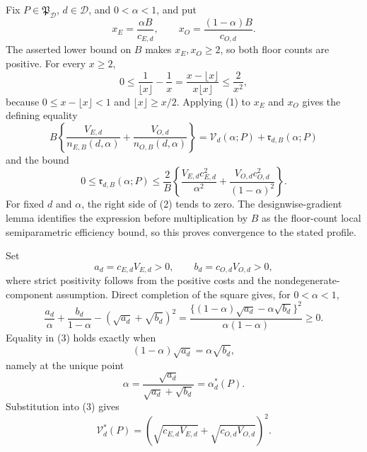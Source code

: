Fix \(P\in\mathfrak P_{\mathcal D}\), \(d\in\mathcal D\), and \(0<\alpha<1\), and put
\[
 x_E=\frac{\alpha B}{c_{E,d}},\qquad
 x_O=\frac{(1-\alpha)B}{c_{O,d}}.
\]
The asserted lower bound on \(B\) makes \(x_E,x_O\ge2\), so both floor counts are positive.  For every \(x\ge2\),
\[
 0\le \frac1{\lfloor x\rfloor}-\frac1x
 =\frac{x-\lfloor x\rfloor}{x\lfloor x\rfloor}
 \le \frac{2}{x^2}, \tag{1}
\]
because \(0\le x-\lfloor x\rfloor<1\) and \(\lfloor x\rfloor\ge x/2\).  Applying (1) to \(x_E\) and \(x_O\) gives the defining equality
\[
 B\left\{\frac{V_{E,d}}{n_{E,B}(d,\alpha)}
 +\frac{V_{O,d}}{n_{O,B}(d,\alpha)}\right\}
 =\mathcal V_d(\alpha;P)+\mathfrak r_{d,B}(\alpha;P)
\]
and the bound
\[
 0\le\mathfrak r_{d,B}(\alpha;P)
 \le\frac2B\left\{
 \frac{V_{E,d}c_{E,d}^2}{\alpha^2}
 +\frac{V_{O,d}c_{O,d}^2}{(1-\alpha)^2}\right\}. \tag{2}
\]
For fixed \(d\) and \(\alpha\), the right side of (2) tends to zero.  The designwise-gradient lemma identifies the expression before multiplication by \(B\) as the floor-count local semiparametric efficiency bound, so this proves convergence to the stated profile.

Set
\[
 a_d=c_{E,d}V_{E,d}>0,\qquad b_d=c_{O,d}V_{O,d}>0,
\]
where strict positivity follows from the positive costs and the nondegenerate-component assumption.  Direct completion of the square gives, for \(0<\alpha<1\),
\[
 \frac{a_d}{\alpha}+\frac{b_d}{1-\alpha}
 -(\sqrt{a_d}+\sqrt{b_d})^2
 =\frac{\{(1-\alpha)\sqrt{a_d}-\alpha\sqrt{b_d}\}^2}
        {\alpha(1-\alpha)}\ge0. \tag{3}
\]
Equality in (3) holds exactly when
\[
 (1-\alpha)\sqrt{a_d}=\alpha\sqrt{b_d},
\]
namely at the unique point
\[
 \alpha=\frac{\sqrt{a_d}}{\sqrt{a_d}+\sqrt{b_d}}
 =\alpha_d^*(P).
\]
Substitution into (3) gives
\[
 \mathcal V_d^*(P)
 =(\sqrt{c_{E,d}V_{E,d}}+\sqrt{c_{O,d}V_{O,d}})^2.
\]